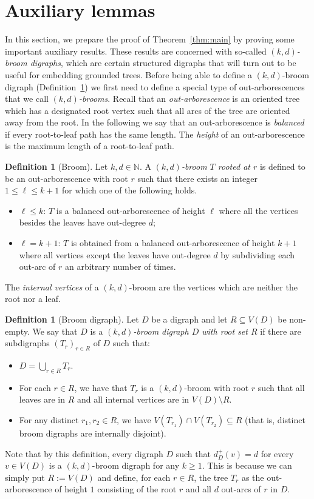 \documentclass[a4paper,11pt]{article}
\theoremstyle{definition}
\newtheorem{definition}[theorem]{\bf Definition}
\begin{document}
\section{Auxiliary lemmas}\label{sec:aux}
In this section, we prepare the proof of Theorem~\ref{thm:main} by proving some important auxiliary results. These results are concerned with so-called \emph{$(k,d)$-broom digraphs}, which are certain structured digraphs that will turn out to be useful for embedding grounded trees. Before being able to define a $(k,d)$-broom digraph (Definition~\ref{def:broomdigraph}) we first need to define a special type of out-arborescences that we call \emph{$(k,d)$-brooms}. Recall that an \emph{out-arborescence} is an oriented tree which has a designated root vertex such that all arcs of the tree are oriented away from the root. In the following we say that an out-arborescence is \emph{balanced} if every root-to-leaf path has the same length. The \emph{height} of an out-arborescence is the maximum length of a root-to-leaf path. 
\begin{definition}[Broom]
    Let $k,d\in \mathbb{N}$. A \emph{$(k,d)$-broom $T$ rooted at $r$} is defined to be an out-arborescence with root $r$ such that there exists an integer $1\leq \ell\leq k+1$ for which one of the following holds.
    \begin{itemize}
        \item $\ell\leq k$: $T$ is a balanced out-arborescence of height $\ell$ where all the vertices besides the leaves have out-degree $d$;
        \item $\ell=k+1$: $T$ is obtained from a balanced out-arborescence of height $k+1$ where all vertices except the leaves have out-degree $d$ by subdividing each out-arc of $r$ an arbitrary number of times.
    \end{itemize}
\end{definition}
The \emph{internal vertices} of a $(k,d)$-broom are the vertices which are neither the root nor a leaf.
\begin{definition}[Broom digraph]\label{def:broomdigraph}
    Let $D$ be a digraph and let $R\subseteq V(D)$ be non-empty. We say that $D$ is a \emph{$(k,d)$-broom digraph $D$ with root set $R$} if there are subdigraphs $(T_r)_{r\in R}$ of $D$ such that:
    \begin{itemize}
    \item $D=\bigcup_{r\in R}{T_r}$.
\item For each $r\in R$, we have that $T_r$ is a $(k,d)$-broom with root $r$ such that all leaves are in $R$ and all internal vertices are in $V(D)\setminus R$.
\item For any distinct $r_1, r_2\in R$, we have $V(T_{r_1})\cap V(T_{r_2})\subseteq R$ (that is, distinct broom digraphs are internally disjoint).
    \end{itemize}
\end{definition}
Note that by this definition, every digraph $D$ such that $d_D^+(v)=d$ for every $v\in V(D)$ is a $(k,d)$-broom digraph for any $k\ge 1$. This is because we can simply put $R:=V(D)$ and define, for each $r\in R$, the tree $T_r$ as the out-arborescence of height $1$ consisting of the root $r$ and all $d$ out-arcs of $r$ in $D$. 
\end{document}
